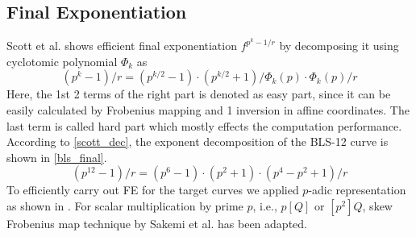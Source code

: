 \subsection{Final Exponentiation}
Scott et al. \cite{scott_finalexp} shows efficient final exponentiation $f^{p^k-1/r}$ by decomposing it using cyclotomic polynomial $\Phi_{k}$ as 
\begin{equation}\label{scott_dec}
(p^k-1)/r = (p^{k/2}-1) \cdot(p^{k/2}+1)/\Phi_{k}(p)\cdot \Phi_{k}(p)/r
\end{equation}
Here, the 1st 2 terms of the right part is denoted as easy part, since it can be easily calculated by Frobenius mapping and 1 inversion in affine coordinates. 
The last term is called hard part which mostly effects the computation performance.
According to \eqref{scott_dec}, the exponent decomposition of the BLS-12 curve is shown in \eqref{bls_final}.
\begin{equation}\label{bls_final}
(p^{12}-1)/r = (p^{6}-1) \cdot(p^{2}+1)\cdot (p^4-p^2+1)/r
\end{equation}
To efficiently carry out FE for the target curves we applied $p$-adic representation as shown in \cite{loubna_bls12}.
For scalar multiplication by prime $p$, i.e., $p[Q]$ or $[p^2]Q$, skew Frobenius map technique by Sakemi et al. \cite{sakemi_skew} has been adapted.

